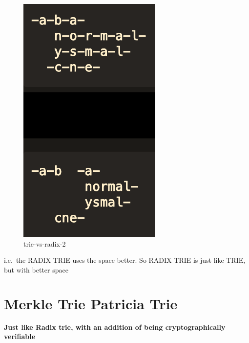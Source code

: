 \documentclass[11pt]{article}
\begin{document}
    \begin{figure}
\centering
\includegraphics{../static/trie-vs-radix-2.png}
\caption{trie-vs-radix-2}
\end{figure}

    i.e.~the RADIX TRIE uses the space better. So RADIX TRIE is just like
TRIE, but with better space

    \hypertarget{merkle-trie-patricia-trie}{%
\section{Merkle Trie \textbar{} Patricia
Trie}\label{merkle-trie-patricia-trie}}

    \textbf{Just like Radix trie, with an addition of being
cryptographically verifiable}
\end{document}
